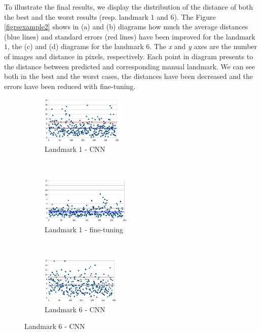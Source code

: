 \documentclass{article} %
\begin{document}
\begin{multicols}{2}
To illustrate the final results, we display the distribution of the
distance of both the best and the worst results (resp. landmark $1$
and $6$). The Figure \ref{figrsexample2} shows in (a) and (b) diagrams
 how much the average distances (blue lines) and standard errors (red lines) have
 been improved for the landmark $1$, the (c) and (d) diagrams for the
 landmark $6$. The \textit{x} and \textit{y} axes are the number of images and distance in pixels, respectively. Each point in diagram presents to the distance between predicted and corresponding manual landmark. We can see both in the best and the worst cases, the distances have been decreased and the errors have been reduced with fine-tuning.

\begin{figure}[H]
   
    \begin{subfigure}[t]{0.24\textwidth}
        \centering
        \includegraphics[height=0.9in]{images/lm1_cnn_2}
        \caption{\footnotesize{Landmark 1 - CNN}}
        \label{figsub11}
    \end{subfigure}%
    ~ 
    \begin{subfigure}[t]{0.24\textwidth}
        \centering
        \includegraphics[height=0.9in]{images/lm1_finetuning_2}
        \caption{\footnotesize{Landmark 1 - fine-tuning}}
        \label{figsub22}
    \end{subfigure}~\\
    \begin{subfigure}[t]{0.24\textwidth}
        \centering
        \includegraphics[height=0.9in]{images/lm6_cnn_2}
        \caption{\footnotesize{Landmark 6 - CNN}}
        \label{figsub111}
    \end{subfigure}%

\end{figure}
\end{multicols}
\end{document}
